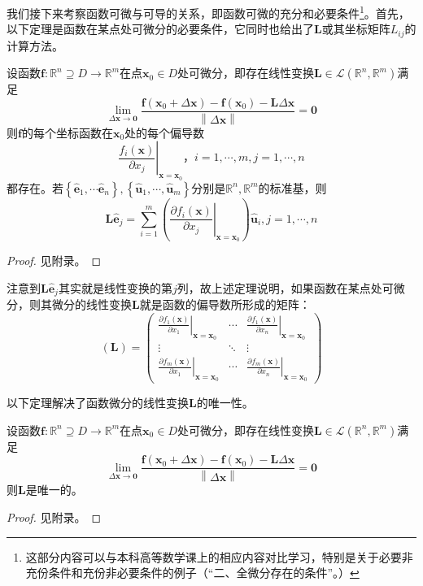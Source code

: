 \documentclass[main.tex]{subfiles}
\begin{document}
我们接下来考察函数可微与可导的关系，即函数可微的充分和必要条件\footnote{这部分内容可以与本科高等数学课上的相应内容对比学习，特别是关于必要非充份条件和充份非必要条件的例子（“二、全微分存在的条件”\cite[p.~20]{华工高数2009下}。）}。首先，以下定理是函数在某点处可微分的必要条件，它同时也给出了$\mathbf{L}$或其坐标矩阵$L_{ij}$的计算方法。

\begin{theorem}\label{thm:II.12.3}
设函数$\mathbf{f}:\mathbb{R}^n\supseteq D\rightarrow\mathbb{R}^m$在点$\mathbf{x}_0\in D$处可微分，即存在线性变换$\mathbf{L}\in\mathcal{L}\left(\mathbb{R}^n,\mathbb{R}^m\right)$满足
\[
\lim_{\Delta\mathbf{x}\to\mathbf{0}}\frac{\mathbf{f}\left(\mathbf{x}_0+\Delta \mathbf{x}\right)-\mathbf{f}\left(\mathbf{x}_0\right)-\mathbf{L}\Delta\mathbf{x}}{\left\|\Delta\mathbf{x}\right\|}=\mathbf{0}
\]
则$\mathbf{f}$的每个坐标函数在$\mathbf{x}_0$处的每个偏导数
\[
\left.\frac{f_i\left(\mathbf{x}\right)}{\partial x_j}\right|_{\mathbf{x}=\mathbf{x}_0}，i=1,\cdots,m,j=1,\cdots,n
\]
都存在。若$\left\{\mathbf{\hat{e}}_1,\cdots\mathbf{\hat{e}}_n\right\},\left\{\mathbf{\hat{u}}_1,\cdots,\mathbf{\hat{u}}_m\right\}$分别是$\mathbb{R}^n,\mathbb{R}^m$的标准基，则
\[
\mathbf{L\hat{e}}_j=\sum_{i=1}^m\left(\left.\frac{\partial f_i\left(\mathbf{x}\right)}{\partial x_j}\right|_{\mathbf{x}=\mathbf{x}_0}\right)\mathbf{\hat{u}}_i,j=1,\cdots,n
\]
\end{theorem}
\begin{proof}
见附录。
\end{proof}

注意到$\mathbf{L\hat{e}}_j$其实就是线性变换的第$j$列，故上述定理说明，如果函数在某点处可微分，则其微分的线性变换$\mathbf{L}$就是函数的偏导数所形成的矩阵：
\[
\left(\mathbf{L}\right)=\left(\begin{array}{ccc}
\left.\frac{\partial f_1\left(\mathbf{x}\right)}{\partial x_1}\right|_{\mathbf{x}=\mathbf{x}_0}&\cdots&\left.\frac{\partial f_1\left(\mathbf{x}\right)}{\partial x_n}\right|_{\mathbf{x}=\mathbf{x}_0}\\
\vdots&\ddots&\vdots\\
\left.\frac{\partial f_m\left(\mathbf{x}\right)}{\partial x_1}\right|_{\mathbf{x}=\mathbf{x}_0}&\cdots&\left.\frac{\partial f_m\left(\mathbf{x}\right)}{\partial x_n}\right|_{\mathbf{x}=\mathbf{x}_0}
\end{array}\right)
\]

以下定理解决了函数微分的线性变换$\mathbf{L}$的唯一性。

\begin{theorem}\label{thm:II.12.4}
设函数$\mathbf{f}:\mathbb{R}^n\supseteq D\rightarrow\mathbb{R}^m$在点$\mathbf{x}_0\in D$处可微分，即存在线性变换$\mathbf{L}\in\mathcal{L}\left(\mathbb{R}^n,\mathbb{R}^m\right)$满足
\[
\lim_{\Delta\mathbf{x}\to\mathbf{0}}\frac{\mathbf{f}\left(\mathbf{x}_0+\Delta \mathbf{x}\right)-\mathbf{f}\left(\mathbf{x}_0\right)-\mathbf{L}\Delta\mathbf{x}}{\left\|\Delta\mathbf{x}\right\|}=\mathbf{0}
\]
则$\mathbf{L}$是唯一的。
\end{theorem}
\begin{proof}
见附录。
\end{proof}
\end{document}
